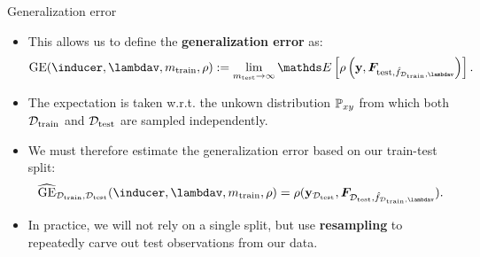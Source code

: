 \documentclass[11pt,compress,t,notes=noshow, xcolor=table]{beamer}
\begin{document}
\begin{vbframe}{Generalization error}

\begin{itemize}
  \item This allows us to define the \textbf{generalization error} as:
  $$\mathrm{GE}(\inducer, \lambdav, m_{\mathrm{train}}, \rho) := 
  \lim_{m_{\mathrm{test}} \rightarrow \infty} \E \left[ \rho \left(
  \yv, \bm{F}_{\mathrm{test},\fh_{\mathcal{D}_{\mathrm{train}}, \lambdav}} 
  \right)\right].$$
  \item The expectation is taken w.r.t. the unkown distribution $\mathbb{P}_{xy}$ from 
  which both $\mathcal{D}_{\text{train}}$ and $\mathcal{D}_{\text{test}}$ are sampled independently.
  \item We must therefore estimate the generalization error based on our 
  train-test split:
  $$\widehat{\mathrm{GE}}_{\Dtrain, \Dtest}(\inducer,
  \lambdav, m_\mathrm{train}, \rho) =
  \rho(\yv_{\Dtest}, \bm{F}_{\Dtest, 
  \fh_{\mathcal{D}_{\mathrm{train}}, \lambdav}}).$$
  \item In practice, we will not rely on a single split, but use 
  \textbf{resampling} to repeatedly carve out test observations from our data.
\end{itemize}

\end{vbframe}

\end{document}
